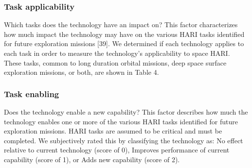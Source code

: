 
\subsubsection{Task applicability}
Which tasks does the technology have an impact on? This factor characterizes how much impact the technology may have on the various HARI tasks identified for future exploration missions [39]. We determined if each technology applies to each task in order to measure the technology's applicability to space HARI. These tasks, common to long duration orbital missions, deep space surface exploration missions, or both, are shown in Table 4.


\subsubsection{Task enabling}
Does the technology enable a new capability? This factor describes how much the technology enables one or more of the various HARI tasks identified for future exploration missions. HARI tasks are assumed to be critical and must be completed. We subjectively rated this by classifying the technology as: No effect relative to current technology (score of 0), Improves performance of current capability (score of 1), or Adds new capability (score of 2).

